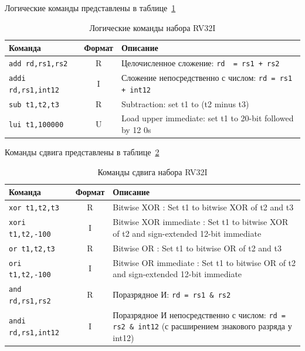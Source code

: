 Логические команды представлены в таблице~\ref{table-base-logical}

\begin{table}[h]
    \caption{Логические команды набора RV32I}
    \centering
    \begin{tabularx}{\textwidth}{|l|c|X|}
        \hline
        \textbf{Команда} & \textbf{Формат} & \textbf{Описание} \\
        \hline \verb|add rd,rs1,rs2| & R & Целочисленное сложение: \verb|rd  = rs1 + rs2| \\
        \hline \verb|addi rd,rs1,int12| & I & Сложение непосредственно с числом: \verb|rd = rs1 + int12| \\
        \hline \verb|sub t1,t2,t3| & R & Subtraction: set t1 to (t2 minus t3) \\
        \hline \verb|lui t1,100000| & U & Load upper immediate: set t1 to 20-bit followed by 12 0s \\
        \hline
    \end{tabularx}
    \label{table-base-logical}
\end{table}


Команды сдвига представлены в таблице~\ref{table-base-shift}

\begin{table}[h]
    \caption{Команды сдвига набора RV32I}
    \centering
    \begin{tabularx}{\textwidth}{|l|c|X|}
        \hline
        \textbf{Команда} & \textbf{Формат} & \textbf{Описание} \\
        \hline \verb|xor t1,t2,t3| & R & Bitwise XOR : Set t1 to bitwise XOR of t2 and t3 \\
        \hline \verb|xori t1,t2,-100| & I & Bitwise XOR immediate : Set t1 to bitwise XOR of t2 and sign-extended   12-bit immediate \\
        \hline \verb|or t1,t2,t3| & R & Bitwise OR : Set t1 to bitwise OR of t2 and t3 \\
        \hline \verb|ori t1,t2,-100| & I & Bitwise OR immediate : Set t1 to bitwise OR of t2 and sign-extended 12-bit immediate \\
        \hline \verb|and rd,rs1,rs2| & R & Поразрядное И: \verb|rd = rs1 & rs2| \\
        \hline \verb|andi rd,rs1,int12| & I & Поразрядное И непосредственно с числом: \verb|rd = rs2 & int12| (с расширением знакового разряда у int12) \\
        \hline
    \end{tabularx}
    \label{table-base-shift}
\end{table}

